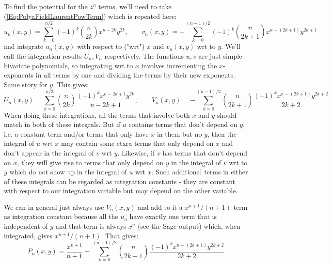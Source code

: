 \documentclass[12pt]{article}
\begin{document}
\medskip
To find the potential for the $z^n$ terms, we'll need to take (\ref{Eq:PolyaFieldLaurentPowTerm}) which is repeated here:
\begin{equation}
u_n(x,y) = \sum_{k=0}^{n/2} (-1)^k \binom{n}{2 k} x^{n-2k} y^{2k}
,\qquad
v_n(x,y) = -\sum_{k=0}^{(n-1)/2} (-1)^k \binom{n}{2k+1} x^{n-(2k+1)} y^{2k+1}
\end{equation}
and integrate $u_n(x,y)$ with respect to ("wrt") $x$ and $v_n(x,y)$ wrt to $y$. We'll call the integration results $U_n, V_n$ respectively. The functions $u,v$ are just simple bivariate polynomials, so integrating wrt to $x$ involves incrementing the $x$-exponents in all terms by one and dividing the terms by their new exponents. Same story for $y$. This gives:
\begin{equation}
U_n(x,y) = \sum_{k=0}^{n/2} \binom{n}{2 k} \frac{(-1)^k x^{n-2k+1} y^{2k}}{n-2k+1}
,\qquad
V_n(x,y) = -\sum_{k=0}^{(n-1)/2} \binom{n}{2k+1} \frac{(-1)^k x^{n-(2k+1)} y^{2k+2}}{2k+2}
\end{equation}
When doing these integrations, all the terms that involve both $x$ and $y$ should match in both of these integrals. But if $u$ contains terms that don't depend on $y$, i.e. a constant term and/or terms that only have $x$ in them but no $y$, then the integral of $u$ wrt $x$ may contain some etxra terms that only depend on $x$ and don't appear in the integral of $v$ wrt $y$. Likewise, if $v$ has terms that don't depend on $x$, they will give rise to terms that only depend on $y$ in the integral of $v$ wrt to $y$ which do not show up in the integral of $u$ wrt $x$. Such additional terms in either of these integrals can be regarded as integration constants - they are constant with respect to our integration variable but may depend on the other variable.

\medskip
We can in general just always use $V_n(x,y)$ and add to it a $x^{n+1}/(n+1)$ term as integration constant because all the $u_n$ have exactly one term that is independent of $y$ and that term is always $x^n$ (see the Sage output) which, when integrated, gives $x^{n+1}/(n+1)$. That gives:
\begin{equation}
\label{Eq:PolyaPotentialLaurentTerm}	
\boxed{	
P_n(x,y) = \frac{x^{n+1}}{n+1} 
           -\sum_{k=0}^{(n-1)/2} \binom{n}{2k+1} \frac{(-1)^k x^{n-(2k+1)} y^{2k+2}}{2k+2}
}
\end{equation}
\end{document}
